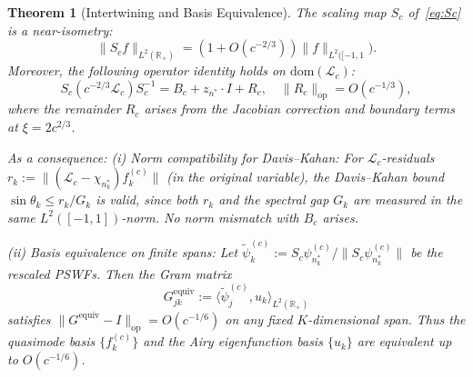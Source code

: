 \documentclass[12pt,a4paper]{amsart}
\newtheorem{theorem}{Theorem}[section]
\theoremstyle{definition}
\newcommand{\Lc}{\mathcal{L}_c}
\newcommand{\norm}[1]{\|#1\|}
\newcommand{\R}{\mathbb{R}}
\newcommand{\op}{\mathrm{op}}
\begin{document}
\begin{theorem}[Intertwining and Basis Equivalence]
\label{thm:intertwine}
The scaling map $S_c$ of~\eqref{eq:Sc} is a near-isometry:
\begin{equation}\label{eq:isometry}
  \norm{S_cf}_{L^2(\R_+)} = (1+O(c^{-2/3}))\norm{f}_{L^2([-1,1}).
\end{equation}
Moreover, the following operator identity holds on $\mathrm{dom}(\Lc)$:
\begin{equation}\label{eq:intertwine}
  S_c(c^{-2/3}\Lc)S_c^{-1} = B_c + z_{n^*}\cdot I + R_c,
  \quad \|R_c\|_{\op} = O(c^{-1/3}),
\end{equation}
where the remainder $R_c$ arises from the Jacobian correction
and boundary terms at $\xi = 2c^{2/3}$.

As a consequence:\newline
\emph{(i) Norm compatibility for Davis--Kahan:}
For $\Lc$-residuals $r_k := \norm{(\Lc-\chi_{n_k^*})f_k^{(c)}}$
(in the original variable), the Davis--Kahan bound
$\sin\theta_k\leq r_k/G_k$ is valid, since both $r_k$ and
the spectral gap $G_k$ are measured in the same $L^2([-1,1])$-norm.
No norm mismatch with $B_c$ arises.

\emph{(ii) Basis equivalence on finite spans:}
Let $\tilde\psi_k^{(c)} := S_c\psi_{n_k^*}^{(c)}/\|S_c\psi_{n_k^*}^{(c)}\|$
be the rescaled PSWFs. Then the Gram matrix
\begin{equation}\label{eq:gram}
  G_{jk}^{\mathrm{equiv}} :=
  \langle\tilde\psi_j^{(c)}, u_k\rangle_{L^2(\R_+)}
\end{equation}
satisfies $\|G^{\mathrm{equiv}} - I\|_{\op} = O(c^{-1/6})$
on any fixed $K$-dimensional span.
Thus the quasimode basis $\{f_k^{(c)}\}$ and the Airy eigenfunction
basis $\{u_k\}$ are equivalent up to $O(c^{-1/6})$.
\end{theorem}
\end{document}
